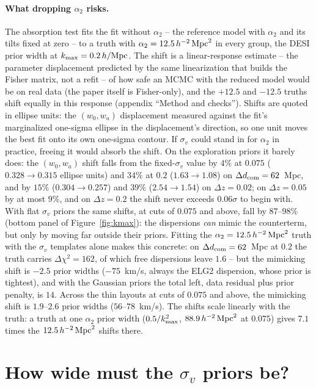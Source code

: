 \documentclass[11pt]{article}
\newcommand{\kmax}{k_{\rm max}}
\newcommand{\hMpc}{\,h/{\rm Mpc}}
\newcommand{\aunit}{\,h^{-2}\,{\rm Mpc}^2}
\newcommand{\sv}{\sigma_v}
\newcommand{\dcom}{$\Delta d_{\rm com} = 62$~Mpc}
\begin{document}
\paragraph{What dropping $\alpha_2$ risks.}
The absorption test fits the fit without $\alpha_2$ -- the reference
model with $\alpha_2$ and its tilts fixed at zero -- to a truth with
$\alpha_2 = 12.5\aunit$ in every group, the DESI prior width at
$\kmax = 0.2\hMpc$.  The shift is a linear-response estimate -- the
parameter displacement predicted by the same linearization that builds
the Fisher matrix, not a refit -- of how
safe an MCMC with the reduced model would be on real data (the paper
itself is Fisher-only), and the $+12.5$ and $-12.5$ truths shift
equally in this response (appendix ``Method and checks'').  Shifts are
quoted in ellipse units: the $(w_0, w_a)$ displacement measured
against the fit's marginalized one-sigma ellipse in the displacement's
direction, so one unit moves the best fit onto its own one-sigma
contour.  If $\sv$
could stand in for $\alpha_2$ in practice, freeing it would absorb the
shift.  On the exploration priors it barely does: the $(w_0, w_a)$
shift falls from the fixed-$\sv$ value by $4\%$ at $0.075$
($0.328 \to 0.315$ ellipse units) and $34\%$ at $0.2$
($1.63 \to 1.08$) on \dcom{}, and by $15\%$ ($0.304 \to 0.257$) and
$39\%$ ($2.54 \to 1.54$) on $\Delta z = 0.02$; on $\Delta z = 0.05$ by
at most $9\%$, and on $\Delta z = 0.2$ the shift never exceeds
$0.06\sigma$ to begin with.  With flat $\sv$ priors the same shifts,
at cuts of $0.075$ and above, fall by $87$--$98\%$ (bottom panel of
Figure~\ref{fig:kmax}): the dispersions \emph{can} mimic the
counterterm, but only by moving far outside their priors.  Fitting the
$\alpha_2 = 12.5\aunit$ truth with the $\sv$ templates alone makes
this concrete: on \dcom{} at $0.2$ the truth carries
$\Delta\chi^2 = 162$, of which free dispersions leave $1.6$ -- but the
mimicking shift is $-2.5$ prior widths ($-75$~km/s, always the ELG2
dispersion, whose prior is tightest), and with the Gaussian priors the
total left, data residual plus prior penalty, is $14$.  Across the
thin layouts at cuts of $0.075$ and above, the mimicking shift is
$1.9$--$2.6$ prior widths ($56$--$78$~km/s).  The shifts scale
linearly with the truth: a truth at one $\alpha_2$ prior width
($0.5/\kmax^2$, $88.9\aunit$ at $0.075$) gives $7.1$ times the
$12.5\aunit$ shifts there.

\section{How wide must the $\sv$ priors be?}
\label{sec:width}
\end{document}
